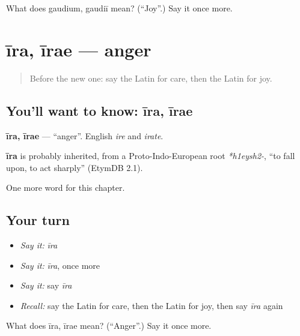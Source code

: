 \begin{tcolorbox}[breakable,colback=teal!4,colframe=teal!35!black,title={Before you move on}]
What does gaudium, gaudiī mean? (\textquotedblleft{}Joy\textquotedblright{}.) Say it once more.
\end{tcolorbox}
\section[īra, īrae]{īra, īrae — anger}

\label{lesson:LA-C69-ira}



\begin{quote}
Before the new one: say the Latin for care, then the Latin for joy.
\end{quote}

\subsection*{You'll want to know: īra, īrae}
\textbf{īra, īrae} — \textquotedblleft{}anger\textquotedblright{}. English \emph{ire} and \emph{irate}.

\begin{cousinweb}
\textbf{īra} is probably inherited, from a Proto-Indo-European root \emph{*h1eysh2-}, \textquotedblleft{}to fall upon, to act sharply\textquotedblright{} (EtymDB 2.1).
\end{cousinweb}

\begin{grammarlens}[title={What you've built}]
One more word for this chapter.
\end{grammarlens}

\subsection*{Your turn}
\begin{itemize}
\raggedright
  \item \emph{Say it:} \emph{īra}
  \item \emph{Say it:} \emph{īra}, once more
  \item \emph{Say it:} say \emph{īra}
  \item \emph{Recall:} say the Latin for care, then the Latin for joy, then say \emph{īra} again
\end{itemize}

\begin{tcolorbox}[breakable,colback=teal!4,colframe=teal!35!black,title={Before you move on}]
What does īra, īrae mean? (\textquotedblleft{}Anger\textquotedblright{}.) Say it once more.
\end{tcolorbox}
